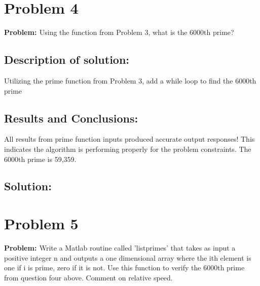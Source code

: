 \documentclass[12pt]{article} %
\begin{document}
\section {Problem 4}
{\bf{Problem: }}
Using the function from Problem 3, what is the 6000th prime?

\subsection{Description of solution:}
Utilizing the prime function from Problem 3, add a while loop to find the 6000th prime

\subsection{Results and Conclusions:}
All results from prime function inputs produced accurate output responses! This indicates the algorithm is performing properly for the problem constraints.  
The 6000th prime is 59,359.

\hfill
\newpage

\subsection{Solution:}





%

\section {Problem 5}
{\bf{Problem: }}
Write a Matlab routine called 'listprimes' that takes as input a positive integer n and outputs a one dimensional array where the ith element is one if i is prime, zero if it is not. Use this function to verify the 6000th prime from question four above. Comment on relative speed.
\end{document}
